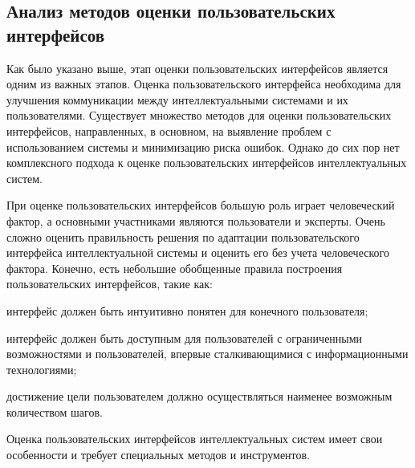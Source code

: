 \subsection{Анализ методов оценки пользовательских интерфейсов}
\label{sec_UI_analisys}

Как было указано выше, этап оценки пользовательских интерфейсов является одним из важных этапов.
Оценка пользовательского интерфейса необходима для улучшения коммуникации между интеллектуальными системами и их пользователями. Существует множество методов для оценки пользовательских интерфейсов, направленных, в основном, на выявление проблем с использованием системы и минимизацию риска ошибок. Однако до сих пор нет комплексного подхода к оценке пользовательских интерфейсов интеллектуальных систем.

При оценке пользовательских интерфейсов большую роль играет человеческий фактор, а основными участниками являются пользователи и эксперты. Очень сложно оценить правильность решения по адаптации пользовательского интерфейса интеллектуальной системы и оценить его без учета человеческого фактора. Конечно, есть небольшие обобщенные правила построения пользовательских интерфейсов, такие как:

\begin{textitemize}
	\item интерфейс должен быть интуитивно понятен для конечного пользователя;
	\item интерфейс должен быть доступным для пользователей с ограниченными возможностями и пользователей, впервые сталкивающимися с информационными технологиями;
	\item достижение цели пользователем должно осуществляться наименее возможным количеством шагов.
\end{textitemize}


Оценка пользовательских интерфейсов интеллектуальных систем имеет свои особенности и требует специальных методов и инструментов.

